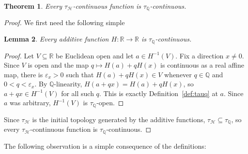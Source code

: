 \documentclass[11pt]{amsart} %
\newtheorem{theorem}{Theorem}[section]
\newtheorem{lemma}[theorem]{Lemma}
\theoremstyle{definition}
\newcommand{\R}{\mathbb{R}}
\newcommand{\Q}{\mathbb{Q}}
\newcommand{\AD}{\mathcal{H}}
\begin{document}
\begin{theorem} 
Every $\tau_{\AD}$-continuous function is $\tau_{\Q}$-continuous. 
\end{theorem} 
\begin{proof} 
We first need the following simple

\begin{lemma} 
Every additive function $H:\R\rightarrow \R$ is $\tau_{\Q}$-continuous. 
\label{lemma:4.3}
\end{lemma} 
\begin{proof} 

Let \(V\subseteq\R\) be Euclidean open and let \(a\in H^{-1}(V)\). Fix a direction \(x\ne0\). Since \(V\) is open and the map \(q\mapsto H(a)+qH(x)\) is continuous as a real affine map, there is \(\varepsilon_x>0\) such that \(H(a)+qH(x)\in V\) whenever \(q\in\Q\) and \(0<q<\varepsilon_x\). By \(\Q\)-linearity, $H(a+qx)=H(a)+qH(x)$, 
so \(a+qx\in H^{-1}(V)\) for all such \(q\). This is exactly Definition~\ref{def:tauq} at \(a\). Since \(a\) was arbitrary, \(H^{-1}(V)\) is \(\tau_{\Q}\)-open.
\end{proof}
Since $\tau_{\AD}$ is the initial topology generated by the additive functions, $\tau_{\AD}\subseteq \tau_{\Q}$, 
so every $\tau_{\AD}$-continuous function is $\tau_{\Q}$-continuous. 
\end{proof} 

The following observation is a simple consequence of the definitions: 
\end{document}
